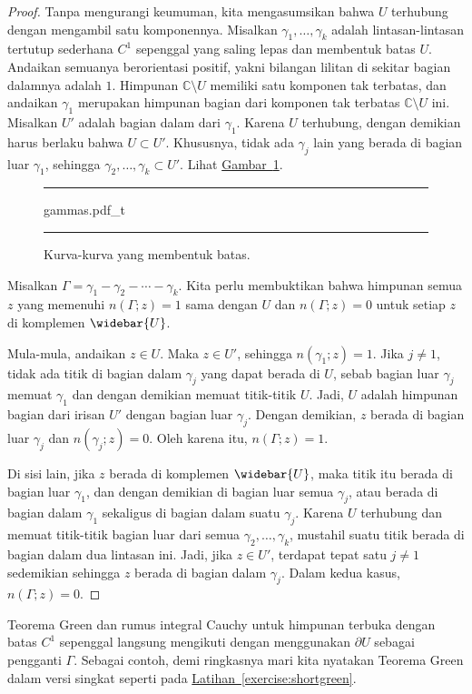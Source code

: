 \documentclass[12pt,openany]{book}
\newcommand{\C}{{\mathbb{C}}}
\theoremstyle{plain}
\theoremstyle{remark}
\theoremstyle{definition}
\newenvironment{myfig}{%
\begin{figure}[h!t]
\noindent\rule{\textwidth}{0.5pt}\vspace{12pt}\par\centering}%
{\par\noindent\rule{\textwidth}{0.5pt}
\end{figure}}
\theoremstyle{exercise}
\theoremstyle{example}
\newcommand{\figureref}[1]{\hyperref[#1]{Gambar~\ref*{#1}}}
\newcommand{\exerciseref}[1]{\hyperref[#1]{Latihan~\ref*{#1}}}
\begin{document}
\begin{proof}
Tanpa mengurangi keumuman, kita mengasumsikan bahwa $U$ terhubung dengan mengambil
satu komponennya.
Misalkan $\gamma_1,\ldots,\gamma_k$ adalah lintasan-lintasan tertutup sederhana $C^1$ sepenggal
yang saling lepas dan membentuk batas $U$. Andaikan semuanya berorientasi
positif, yakni bilangan lilitan di sekitar bagian dalamnya adalah $1$.
Himpunan $\C \setminus U$
memiliki satu komponen tak terbatas, dan andaikan $\gamma_1$ merupakan himpunan bagian dari
komponen tak terbatas $\C \setminus U$ ini. Misalkan $U'$ adalah bagian dalam dari
$\gamma_1$. Karena $U$ terhubung, dengan demikian harus berlaku bahwa
$U \subset U'$.
Khususnya, tidak ada $\gamma_j$ lain yang berada di bagian luar $\gamma_1$, sehingga
$\gamma_2,\ldots,\gamma_k \subset U'$.
Lihat \figureref{fig:gammas}.
\begin{myfig}
{gammas.pdf_t}
\caption{Kurva-kurva yang membentuk batas.\label{fig:gammas}}
\end{myfig}

Misalkan $\Gamma = \gamma_1 - \gamma_2 - \cdots - \gamma_k$.
Kita perlu membuktikan bahwa himpunan semua $z$ yang memenuhi $n(\Gamma;z) = 1$ sama dengan
$U$ dan $n(\Gamma;z) = 0$ untuk setiap $z$ di komplemen $\widebar{U}$.

Mula-mula, andaikan $z \in U$. Maka $z \in U'$, sehingga $n(\gamma_1;z) = 1$.
Jika $j \neq 1$, tidak ada titik di bagian dalam $\gamma_j$ yang dapat berada di $U$, sebab
bagian luar $\gamma_j$ memuat $\gamma_1$ dan dengan demikian memuat titik-titik $U$.
Jadi, $U$ adalah himpunan bagian dari irisan $U'$ dengan bagian luar
$\gamma_j$.
Dengan demikian, $z$ berada di bagian luar $\gamma_j$ dan $n(\gamma_j;z) = 0$. Oleh karena itu,
$n(\Gamma;z) = 1$.

Di sisi lain, jika $z$ berada di komplemen $\widebar{U}$, maka titik itu berada
di bagian luar $\gamma_1$, dan dengan demikian di bagian luar semua
$\gamma_j$, atau berada di bagian dalam $\gamma_1$ sekaligus di bagian dalam
suatu $\gamma_j$. Karena $U$ terhubung dan memuat titik-titik bagian luar
dari semua $\gamma_2,\ldots,\gamma_k$, mustahil suatu titik berada di
bagian dalam dua lintasan ini. Jadi, jika $z \in U'$, terdapat tepat
satu $j \neq 1$
sedemikian sehingga $z$ berada di bagian dalam $\gamma_j$. Dalam kedua kasus,
$n(\Gamma;z) = 0$.
\end{proof}

Teorema Green dan rumus integral Cauchy untuk himpunan terbuka dengan
batas $C^1$ sepenggal langsung mengikuti
dengan menggunakan $\partial U$ sebagai pengganti $\Gamma$.
Sebagai contoh, demi ringkasnya mari kita nyatakan Teorema Green dalam versi singkat
seperti pada \exerciseref{exercise:shortgreen}.
\end{document}
